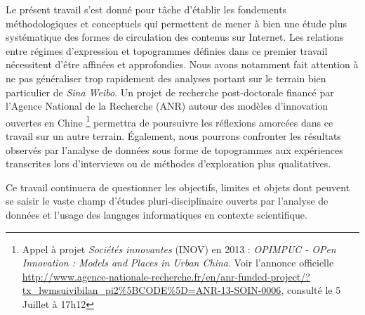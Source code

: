 Le présent travail s'est donné pour tâche d'établir les fondements méthodologiques et conceptuels qui permettent de mener à bien une étude plus systématique des formes de circulation des contenus sur Internet. Les relations entre régimes d'expression et topogrammes définies dans ce premier travail nécessitent d'être affinées et approfondies. Nous avons notamment fait attention à ne pas généraliser trop rapidement des analyses portant sur le terrain bien particulier de \textit{Sina Weibo}. Un projet de recherche post-doctorale financé par l'Agence National de la Recherche (ANR) autour des modèles d'innovation ouvertes en Chine
\footnote{
    Appel à projet \textit{Sociétés innovantes} (INOV) en 2013 : \textit{OPIMPUC - OPen Innovation : Models and Places in Urban China}. Voir l'annonce officielle \url{http://www.agence-nationale-recherche.fr/en/anr-funded-project/?tx_lwmsuivibilan_pi2\%5BCODE\%5D=ANR-13-SOIN-0006}, consulté le 5 Juillet à 17h12
} permettra de poursuivre les réflexions amorcées dans ce travail sur un autre terrain. Également, nous pourrons confronter les résultats observés par l'analyse de données sous forme de topogrammes aux expériences transcrites lors d'interviews ou de méthodes d'exploration plus qualitatives. 

Ce travail continuera de questionner les objectifs, limites et objets dont peuvent se saisir le vaste champ d'études pluri-disciplinaire ouverts par l'analyse de données et l'usage des langages informatiques en contexte scientifique.
